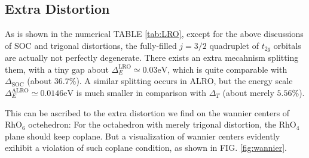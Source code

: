 \documentclass[10pt,nofootinbib,letterpaper]{revtex4}
\begin{document}
	\subsection{Extra Distortion}
		As is shown in the numerical TABLE \ref{tab:LRO}, except for the above discussions of SOC and trigonal distortions, the fully-filled $j=3/2$ quadruplet of $t_{2g}$ orbitals are actually not perfectly degenerate. There exists an extra mecahnism splitting them, with a tiny gap about $\Delta_E^{\mathrm{LRO}}\simeq0.03\mathrm{eV}$, which is quite comparable with $\Delta_{\text{SOC}}$ (about $36.7\%$). A similar splitting occurs in ALRO, but the energy scale $\Delta_E^{\text{ALRO}}\simeq0.0146\mathrm{eV}$ is much smaller in comparison with $\Delta_T$ (about merely $5.56\%$).\par
		This can be ascribed to the extra distortion we find on the wannier centers of $\mathrm{RhO}_6$ octehedron: For the octahedron with merely trigonal distortion, the $\mathrm{RhO}_4$ plane should keep coplane. But a visualization of wannier centers evidently exihibit a violation of such coplane condition, as shown in FIG. \ref{fig:wannier}.\par
\end{document}

